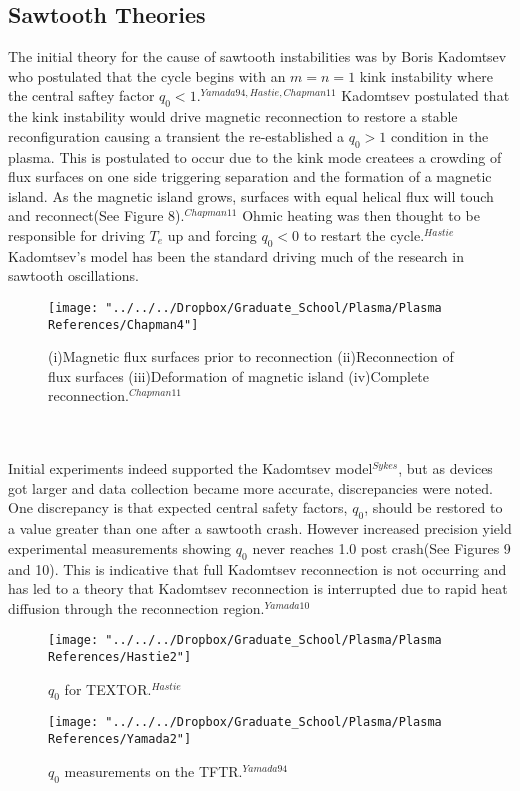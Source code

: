 \documentclass{article}
\begin{document}
\subsection{Sawtooth Theories}
The initial theory for the cause of sawtooth instabilities was by Boris Kadomtsev who postulated that the cycle begins with an $m=n=1$ kink instability where the central saftey factor $q_0<1$.$^{Yamada94,Hastie,Chapman11}$  Kadomtsev postulated that the kink instability would drive magnetic reconnection to restore a stable reconfiguration causing a transient the re-established a $q_0>1$ condition in the plasma.  This is postulated to occur due to the kink mode createes a crowding of flux surfaces on one side triggering separation and the formation of a magnetic island.  As the magnetic island grows, surfaces with equal helical flux will touch and reconnect(See Figure 8).$^{Chapman11}$  Ohmic heating was then thought to be responsible for driving $T_e$ up and forcing $q_0<0$ to restart the cycle.$^{Hastie}$  Kadomtsev's model has been the standard driving much of the research in sawtooth oscillations.
\begin{figure}[h]
\centering
\texttt{[image: "../../../Dropbox/Graduate\_School/Plasma/Plasma References/Chapman4"]}
\caption{(i)Magnetic flux surfaces prior to reconnection (ii)Reconnection of flux surfaces (iii)Deformation of magnetic island (iv)Complete reconnection.$^{Chapman11}$}
\label{fig:Chapman4}
\end{figure}
\\\\Initial experiments indeed supported the Kadomtsev model$^{Sykes}$, but as devices got larger and data collection became more accurate, discrepancies were noted.  One discrepancy is that expected central safety factors, $q_0$, should be restored to a value greater than one after a sawtooth crash.  However increased precision yield experimental measurements showing $q_0$ never reaches 1.0 post crash(See Figures 9 and 10).  This is indicative that full Kadomtsev reconnection is not occurring and has led to a theory that Kadomtsev reconnection is interrupted due to rapid heat diffusion through the reconnection region.$^{Yamada10}$
\begin{figure}[h]
\centering
\texttt{[image: "../../../Dropbox/Graduate\_School/Plasma/Plasma References/Hastie2"]}
\caption{$q_0$ for TEXTOR.$^{Hastie}$}
\label{fig:Hastie2}
\end{figure}
\begin{figure}[h]
\centering
\texttt{[image: "../../../Dropbox/Graduate\_School/Plasma/Plasma References/Yamada2"]}
\caption{$q_0$ measurements on the TFTR.$^{Yamada94}$}
\label{fig:Yamada2}
\end{figure}
\end{document}
